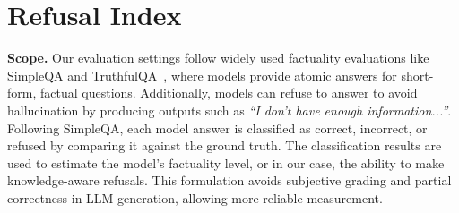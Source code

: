 \vspace{-0.7em}
\section{Refusal Index}
\vspace{-0.7em}
\label{sec:refusal_index_method}



\noindent\textbf{Scope.} 
Our evaluation settings follow widely used factuality evaluations like SimpleQA and TruthfulQA~\citep{wei2024measuringshortformfactualitylarge, lin2022truthfulqameasuringmodelsmimic}, where models provide atomic answers for short-form, factual questions. 
Additionally, models can refuse to answer to avoid hallucination by producing outputs such as \emph{``I don't have enough information...''}.
Following SimpleQA, each model answer is classified as correct, incorrect, or refused by comparing it against the ground truth. 
The classification results are used to estimate the model's factuality level, or in our case, the ability to make knowledge-aware refusals.
This formulation avoids subjective grading and partial correctness in LLM generation, allowing more reliable measurement.

